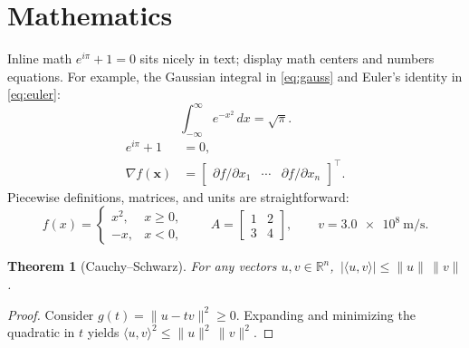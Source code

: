 \documentclass[11pt]{article}
\newtheorem{theorem}{Theorem}
\newcommand{\R}{\mathbb{R}}
\newcommand{\vect}[1]{\boldsymbol{#1}}
\begin{document}
\section{Mathematics}
Inline math $e^{i\pi}+1=0$ sits nicely in text; display math centers and numbers equations. For example, the Gaussian integral in \cref{eq:gauss} and Euler's identity in \cref{eq:euler}:
\begin{equation}\label{eq:gauss}
\int_{-\infty}^{\infty} e^{-x^2}\,dx = \sqrt{\pi}.
\end{equation}
\begin{align}
  e^{i\pi} + 1 &= 0, \label{eq:euler}\\
  \nabla f(\vect{x}) &= \begin{bmatrix} \partial f/\partial x_1 & \cdots & \partial f/\partial x_n \end{bmatrix}^{\!\top}.
\end{align}
Piecewise definitions, matrices, and units are straightforward:
\[
  f(x) = \begin{cases}
    x^2, & x \ge 0, \\
    -x,  & x < 0,
  \end{cases}\qquad
  A = \begin{bmatrix}1 & 2 \\ 3 & 4\end{bmatrix},\qquad v=\SI{3.0e8}{\meter\per\second}.
\]

\begin{theorem}[Cauchy--Schwarz]
For any vectors $u,v\in\R^n$, $\,|\langle u,v\rangle|\le \|u\|\,\|v\|$.
\end{theorem}
\begin{proof}
Consider $g(t)=\|u-t v\|^2\ge 0$. Expanding and minimizing the quadratic in $t$ yields $\langle u,v\rangle^2\le \|u\|^2\,\|v\|^2$.
\end{proof}
\end{document}
